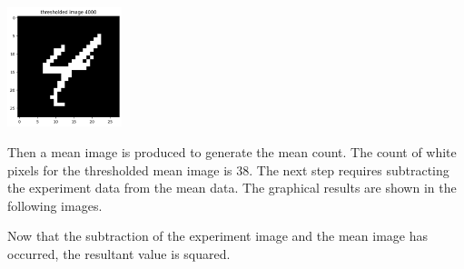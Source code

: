 \begin{center}
\includegraphics[width=0.25\textwidth]{./images/image4.png}
\label{fig:sample4}
\end{center}


Then a mean image is produced to generate the mean count.
The count of white pixels for the thresholded mean image is 38.
The next step requires subtracting the experiment data from the mean data. The graphical results are shown in the following images.

Now that the subtraction of the experiment image and the mean image has occurred, the resultant value is squared.
